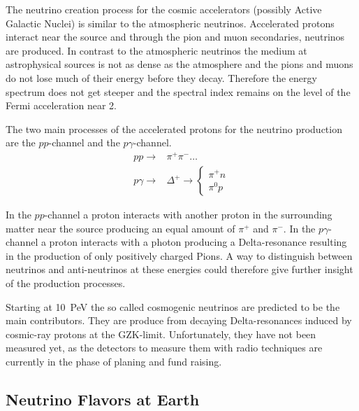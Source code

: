 The neutrino creation process for the cosmic accelerators (possibly Active Galactic Nuclei) is similar to the atmospheric neutrinos.
Accelerated protons interact near the source and through the pion and muon secondaries, neutrinos are produced.
In contrast to the atmospheric neutrinos the medium at astrophysical sources is not as dense as the atmosphere and the pions and muons do not lose much of their energy before they decay.
Therefore the energy spectrum does not get steeper and the spectral index remains on the level of the Fermi acceleration near 2.

The two main processes of the accelerated protons for the neutrino production are the $pp$-channel and the $p\gamma$-channel.
\begin{align}
    p p \to & \pi^+ \pi^- \dots \\
    p \gamma \to & \Delta^+ \to \begin{cases} \pi^+ n \\ \pi^0 p \end{cases}
\end{align}

In the $pp$-channel a proton interacts with another proton in the surrounding matter near the source producing an equal amount of $\pi^+$ and $\pi^-$.
In the $p\gamma$-channel a proton interacts with a photon producing a Delta-resonance resulting in the production of only positively charged Pions.
A way to distinguish between neutrinos and anti-neutrinos at these energies could therefore give further insight of the production processes.

Starting at \SI{10}{PeV} the so called cosmogenic neutrinos are predicted to be the main contributors.
They are produce from decaying Delta-resonances induced by cosmic-ray protons at the GZK-limit.
Unfortunately, they have not been measured yet, as the detectors to measure them with radio techniques are currently in the phase of planing and fund raising.

\subsection{Neutrino Flavors at Earth} \label{sec:nu_osc}

